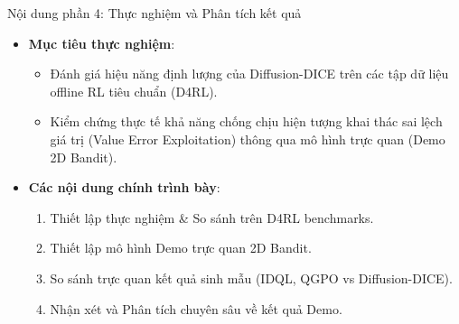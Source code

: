 
\begin{frame}{Nội dung phần 4: Thực nghiệm và Phân tích kết quả}
    \begin{itemize}
        \item \textbf{Mục tiêu thực nghiệm}: 
        \begin{itemize}
            \item Đánh giá hiệu năng định lượng của Diffusion-DICE trên các tập dữ liệu offline RL tiêu chuẩn (D4RL).
            \item Kiểm chứng thực tế khả năng chống chịu hiện tượng khai thác sai lệch giá trị (Value Error Exploitation) thông qua mô hình trực quan (Demo 2D Bandit).
        \end{itemize}
        \item \textbf{Các nội dung chính trình bày}:
        \begin{enumerate}
            \item Thiết lập thực nghiệm \& So sánh trên D4RL benchmarks.
            \item Thiết lập mô hình Demo trực quan 2D Bandit.
            \item So sánh trực quan kết quả sinh mẫu (IDQL, QGPO vs Diffusion-DICE).
            \item Nhận xét và Phân tích chuyên sâu về kết quả Demo.
        \end{enumerate}
    \end{itemize}
\end{frame}

